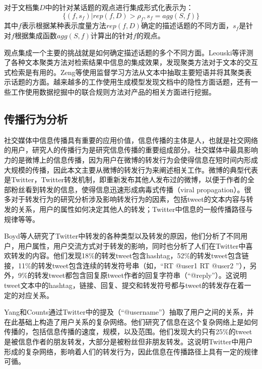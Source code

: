 对于文档集$ D $中的针对某话题的观点进行集成形式化表示为：
\begin{equation}
\{(f,s_f)|rep(f,D)>\rho_f,s_f=agg(S,f)\}
\end{equation}
其中$ f $表示根据某种表示度量方法$ rep(f,D) $确定的描述话题的不同方面，$ s_f $是针对$ f $根据集成函数$ agg(S,f) $计算出的针对$ f $的观点。

观点集成一个主要的挑战就是如何确定描述话题的多个不同方面。Leouski等评测了各种文本聚类方法对检索结果中信息的集成效果，发现聚类方法对于文本的交互式检索是有用的。Zeng等使用监督学习方法从文本中抽取主要短语并将其聚类表示话题的方面。越来越多的工作使用生成模型发现文档中的隐性方面话题，还有一些工作使用数据挖掘中的联合规则方法对产品的相关方面进行挖掘。

\subsection{传播行为分析}
\label{rel3}
社交媒体中信息传播具有重要的应用价值，信息传播的主体是人，也就是社交网络的用户，研究人的传播行为是研究信息传播的重要组成部分。社交媒体中最具影响力的是微博上的信息传播，因为用户在微博的转发行为会使得信息在短时间内形成大规模的传播，因此本文主要从微博的转发行为来阐述相关工作。微博的典型代表是Twitter，Twitter转发机制，即重新发布其他人发布过的微博，以便于作者的全部粉丝看到转发的信息，使得信息迅速形成病毒式传播（viral propagation）。很多对于转发行为的研究分析涉及影响转发行为的因素，包括tweet的文本内容与转发的关系，用户的属性如何决定其他人的转发；Twitter中信息的一般传播路径与规律等等。

Boyd等人研究了Twitter中转发的各种类型以及转发的原因，他们分析了不同用户，用户属性，用户交流方式对于转发的影响，同时也分析了人们在Twitter中喜欢转发的内容。他们发现18\%的转发tweet包含hashtag，52\%的转发tweet包含链接，11\%的转发tweet包含连续的转发符号串（如，“RT @user1 RT @user2 ”），另外，9\%的转发tweet都包含回复原tweet作者的回复字符串（“@reply”）。这说明tweet文本中的hashtag，链接、回复、提交和转发符号都与tweet的转发存在着一定的对应关系。

Yang和Counts通过Twitter中的提及（“@username”）抽取了用户之间的关系，并在此基础上构造了用户关系的复杂网络。他们研究了信息在这个复杂网络上是如何传播的，包括信息传播的速度，规模，以及范围。他们发现大约只有25\%的tweet是被信息作者的朋友转发，大部分是被粉丝但非朋友转发。这说明Twitter中用户形成的复杂网络，影响着人们的转发行为，因此信息在传播路径上具有一定的规律可循。

